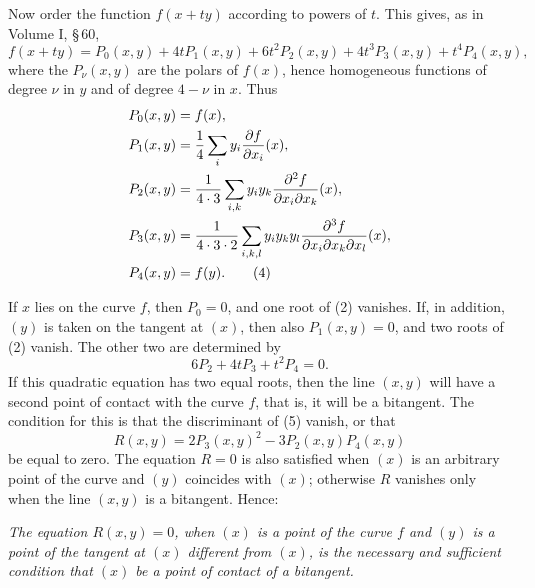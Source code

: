 \documentclass[11pt]{article}
\begin{document}
Now order the function \(f(x+t y)\) according to powers of \(t\). This gives, as in Volume I, \S\,60,
\begin{equation}
 f(x+t y)=P_0(x,y)+4tP_1(x,y)+6t^2P_2(x,y)+4t^3P_3(x,y)+t^4P_4(x,y),
 \tag{3}
\end{equation}
where the \(P_\nu(x,y)\) are the polars of \(f(x)\), hence homogeneous functions of degree \(\nu\) in \(y\) and of degree \(4-\nu\) in \(x\). Thus
\begin{align}
 P_0(x,y)&=f(x),\notag\\
 P_1(x,y)&=\frac14\sum_i y_i\frac{\partial f}{\partial x_i}(x),\notag\\
 P_2(x,y)&=\frac1{4\cdot3}\sum_{i,k}y_i y_k\frac{\partial^2 f}{\partial x_i\partial x_k}(x),\notag\\
 P_3(x,y)&=\frac1{4\cdot3\cdot2}\sum_{i,k,l}y_i y_k y_l\frac{\partial^3 f}{\partial x_i\partial x_k\partial x_l}(x),\notag\\
 P_4(x,y)&=f(y).
 \tag{4}
\end{align}

If \(x\) lies on the curve \(f\), then \(P_0=0\), and one root of (2) vanishes. If, in addition, \((y)\) is taken on the tangent at \((x)\), then also \(P_1(x,y)=0\), and two roots of (2) vanish. The other two are determined by
\begin{equation}
 6P_2+4tP_3+t^2P_4=0.
 \tag{5}
\end{equation}
If this quadratic equation has two equal roots, then the line \((x,y)\) will have a second point of contact with the curve \(f\), that is, it will be a bitangent. The condition for this is that the discriminant of (5) vanish, or that
\begin{equation}
 R(x,y)=2P_3(x,y)^2-3P_2(x,y)P_4(x,y)
 \tag{6}
\end{equation}
be equal to zero. The equation \(R=0\) is also satisfied when \((x)\) is an arbitrary point of the curve and \((y)\) coincides with \((x)\); otherwise \(R\) vanishes only when the line \((x,y)\) is a bitangent. Hence:

\emph{The equation \(R(x,y)=0\), when \((x)\) is a point of the curve \(f\) and \((y)\) is a point of the tangent at \((x)\) different from \((x)\), is the necessary and sufficient condition that \((x)\) be a point of contact of a bitangent.}
\end{document}
